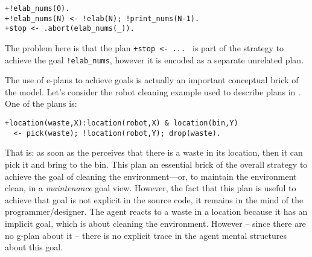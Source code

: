 \begin{small}
\begin{verbatim}
+!elab_nums(0).
+!elab_nums(N) <- !elab(N); !print_nums(N-1).		
+stop <- .abort(elab_nums(_)).
\end{verbatim}
\end{small}

\noindent The problem here is that the plan \texttt{+stop <- ... } is part of the strategy to achieve the goal \texttt{!elab\_nums}, however it is encoded as a separate unrelated plan.


The use of e-plans to achieve goals is actually an important conceptual brick of the {\asl} model.
%
Let's consider the robot cleaning example used to describe plans in {\cite{Rao96}}. 
%
One of the plans is:

\begin{small}
\begin{verbatim}
+location(waste,X):location(robot,X) & location(bin,Y)
  <- pick(waste); !location(robot,Y); drop(waste).
\end{verbatim}
\end{small}

\noindent  That is: as soon as the perceives that there is a waste in its location, then it can pick it and bring to the bin.
%
This plan an essential brick of the overall strategy to achieve the goal of cleaning the environment---or, to maintain the environment clean, in a \emph{maintenance} goal view.
%
However, the fact that this plan is useful to achieve that goal is not explicit in the source code, it remains in the mind of the programmer/designer.
%
%
%
%
%
The agent reacts to a waste in a location because it has an implicit goal, which is about cleaning the environment.
%
However -- since there are no g-plan about it -- there is no explicit trace in the agent mental structures about this goal. 

